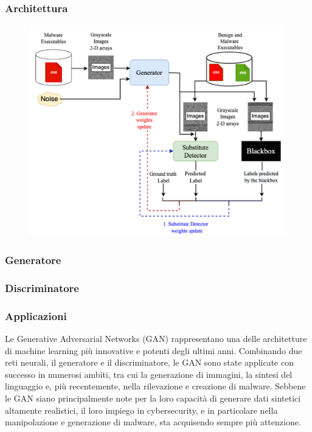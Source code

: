 \subsubsection{Architettura}
\begin{figure}[ht]
    \centering
        \centering
        \includegraphics[width=0.8\linewidth]{images/GAN_architecture.png}
        \label{fig:gan_architecture}
\end{figure}

\subsubsection{Generatore}

\subsubsection{Discriminatore}

\subsubsection{Applicazioni}
Le Generative Adversarial Networks (GAN) rappresentano una delle architetture di machine learning più innovative e potenti degli ultimi anni. Combinando due reti neurali, il generatore e il discriminatore, le GAN sono state applicate con successo in numerosi ambiti, tra cui la generazione di immagini, la sintesi del linguaggio e, più recentemente, nella rilevazione e creazione di malware. Sebbene le GAN siano principalmente note per la loro capacità di generare dati sintetici altamente realistici, il loro impiego in cybersecurity, e in particolare nella manipolazione e generazione di malware, sta acquisendo sempre più attenzione.

